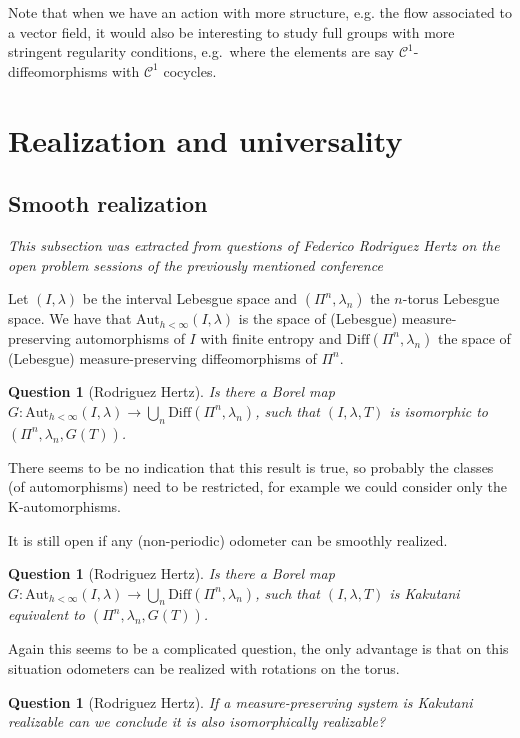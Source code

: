 \documentclass{article}
\newtheorem{question}[theorem]{Question}
\theoremstyle{definition}
\begin{document}
Note that when we have an action with more structure, e.g. the flow associated to a vector field, it would also be interesting to study full groups with more stringent regularity conditions, e.g.~where the elements are say $\mathcal C^1$-diffeomorphisms with $\mathcal C^1$ cocycles.


\section{Realization and universality}

\subsection{Smooth realization}
\textit{This subsection was extracted from questions of Federico Rodriguez Hertz on the open problem sessions of the previously mentioned conference}


Let $(I,\lambda)$ be the interval Lebesgue space and $(\Pi^n,\lambda_n)$ the $n$-torus Lebesgue space. 
We have that $\text{Aut}_{h<\infty}(I,\lambda)$ is the space of (Lebesgue) measure-preserving automorphisms of $I$ with finite entropy and $\text{Diff}(\Pi^n,\lambda_n)$ the space of (Lebesgue) measure-preserving diffeomorphisms of $\Pi^n$. 
\begin{question}
[Rodriguez Hertz] Is there a Borel map $G:\text{Aut}_{h<\infty}(I,\lambda)\rightarrow \bigcup_n \text{Diff}(\Pi^n,\lambda_n)$, such that $(I,\lambda,T)$ is isomorphic to $(\Pi^n,\lambda_n, G(T))$. 
\end{question}

There seems to be no indication that this result is true, so probably the classes (of automorphisms) need to be restricted, for example we could consider only the K-automorphisms. 

It is still open if any (non-periodic) odometer can be smoothly realized. 

\begin{question}
[Rodriguez Hertz] Is there a Borel map $G:\text{Aut}_{h<\infty}(I,\lambda)\rightarrow \bigcup_n \text{Diff}(\Pi^n,\lambda_n)$, such that $(I,\lambda,T)$ is Kakutani equivalent to $(\Pi^n,\lambda_n, G(T))$. 
\end{question}

Again this seems to be a complicated question, the only advantage is that on this situation odometers can be realized with rotations on the torus.  
\begin{question}
[Rodriguez Hertz] If a measure-preserving system is Kakutani realizable can we conclude it is also isomorphically realizable? 
\end{question}
\end{document}
